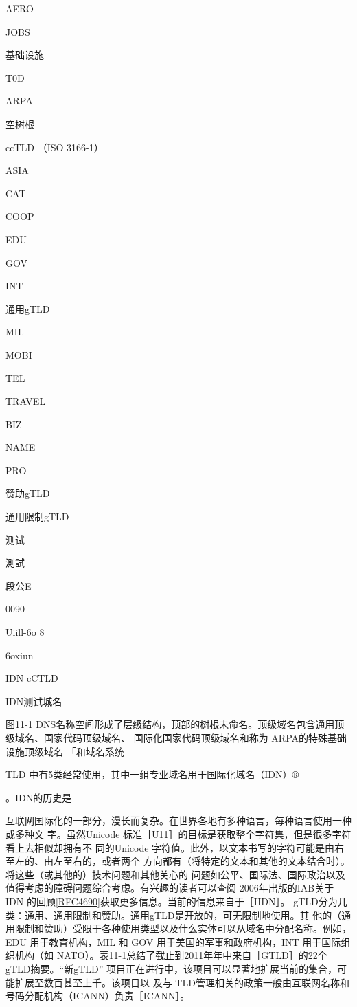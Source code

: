 AERO

JOBS

基础设施

T0D

ARPA

空树根

ccTLD （ISO 3166-1）

ASIA

CAT

COOP

EDU

GOV

INT

通用gTLD

MIL

MOBI

TEL

TRAVEL

BIZ

NAME

PRO

赞助gTLD

通用限制gTLD

测试

測試

段公E

0090

Uiill-6o 8

6oxiun

IDN cCTLD

IDN测试城名

图11-1
DNS名称空间形成了层级结构，顶部的树根未命名。顶级域名包含通用顶级域名、国家代码顶级域名、
国际化国家代码顶级域名和称为 ARPA的特殊基础设施顶级域名
「和域名系统

TLD 中有5类经常使用，其中一组专业域名用于国际化域名（IDN）®

。IDN的历史是

互联网国际化的一部分，漫长而复杂。在世界各地有多种语言，每种语言使用一种或多种文
字。虽然Unicode 标准［U11］的目标是获取整个字符集，但是很多字符看上去相似却拥有不
同的Unicode 字符值。此外，以文本书写的字符可能是由右至左的、由左至右的，或者两个
方向都有（将特定的文本和其他的文本结合时）。将这些（或其他的）技术问题和其他关心的
问题如公平、国际法、国际政治以及值得考虑的障碍问题综合考虑。有兴趣的读者可以查阅
2006年出版的IAB关于IDN 的回顾\href{https://www.rfc-editor.org/rfc/rfc4690}{[RFC4690]}获取更多信息。当前的信息来自于［IIDN］。
gTLD分为几类：通用、通用限制和赞助。通用gTLD是开放的，可无限制地使用。其
他的（通用限制和赞助）受限于各种使用类型以及什么实体可以从域名中分配名称。例如，
EDU 用于教育机构，MIL 和 GOV 用于美国的军事和政府机构，INT 用于国际组织机构（如
NATO）。表11-1总结了截止到2011年年中来自［GTLD］的22个gTLD摘要。“新gTLD”
项目正在进行中，该项目可以显著地扩展当前的集合，可能扩展至数百甚至上千。该项目以
及与 TLD管理相关的政策一般由互联网名称和号码分配机构（ICANN）负责［ICANN］。

